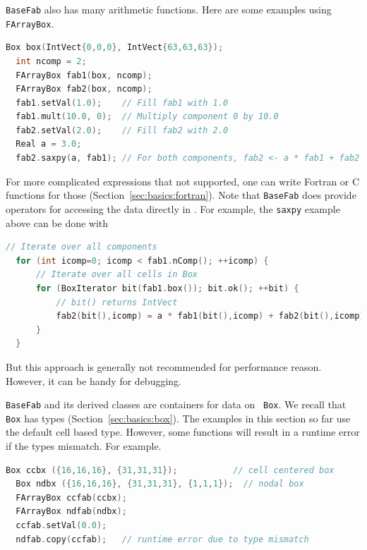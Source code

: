 {{\tt BaseFab} also has many arithmetic functions.  Here are some
examples using {\tt FArrayBox}.
\begin{lstlisting}[language=cpp]
  Box box(IntVect{0,0,0}, IntVect{63,63,63});
  int ncomp = 2;
  FArrayBox fab1(box, ncomp);
  FArrayBox fab2(box, ncomp);
  fab1.setVal(1.0);    // Fill fab1 with 1.0
  fab1.mult(10.0, 0);  // Multiply component 0 by 10.0
  fab2.setVal(2.0);    // Fill fab2 with 2.0
  Real a = 3.0;
  fab2.saxpy(a, fab1); // For both components, fab2 <- a * fab1 + fab2
\end{lstlisting}
For more complicated expressions that not supported, one can write
Fortran or C functions for those (Section~\ref{sec:basics:fortran}).
Note that {\tt BaseFab} does provide operators for accessing the
data directly in \cpp.  For example, the {\tt saxpy} example above can
be done with
\begin{lstlisting}[language=cpp]
  // Iterate over all components
  for (int icomp=0; icomp < fab1.nComp(); ++icomp) {
      // Iterate over all cells in Box
      for (BoxIterator bit(fab1.box()); bit.ok(); ++bit) {
          // bit() returns IntVect
          fab2(bit(),icomp) = a * fab1(bit(),icomp) + fab2(bit(),icomp);
      }
  }
\end{lstlisting}
But this approach is generally not recommended for performance reason.
However, it can be handy for debugging.

{\tt BaseFab} and its derived classes are containers for data on {\tt
  Box}.  We recall that {\tt Box} has types
(Section~\ref{sec:basics:box}).  The examples in this section so far
use the default cell based type.  However, some functions will result
in a runtime error if the types mismatch.  For example.
\begin{lstlisting}[language=cpp]
  Box ccbx ({16,16,16}, {31,31,31});           // cell centered box
  Box ndbx ({16,16,16}, {31,31,31}, {1,1,1});  // nodal box
  FArrayBox ccfab(ccbx);
  FArrayBox ndfab(ndbx);
  ccfab.setVal(0.0);
  ndfab.copy(ccfab);   // runtime error due to type mismatch
\end{lstlisting}

}
